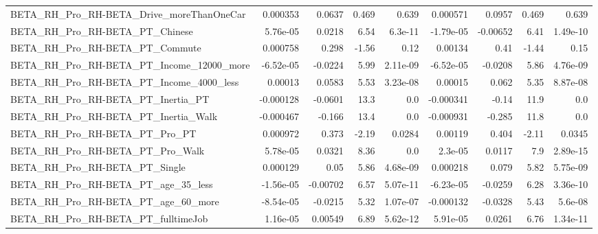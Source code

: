 \begin{tabular}{lrrrrrrrr}
BETA\_RH\_Pro\_RH-BETA\_Drive\_moreThanOneCar           &    0.000353 &       0.0637 &    0.469 &    0.639 &   0.000571 &      0.0957 &        0.469 &         0.639 \\
BETA\_RH\_Pro\_RH-BETA\_PT\_Chinese                     &    5.76e-05 &       0.0218 &     6.54 &  6.3e-11 &  -1.79e-05 &    -0.00652 &         6.41 &      1.49e-10 \\
BETA\_RH\_Pro\_RH-BETA\_PT\_Commute                     &    0.000758 &        0.298 &    -1.56 &     0.12 &    0.00134 &        0.41 &        -1.44 &          0.15 \\
BETA\_RH\_Pro\_RH-BETA\_PT\_Income\_12000\_more           &   -6.52e-05 &      -0.0224 &     5.99 & 2.11e-09 &  -6.52e-05 &     -0.0208 &         5.86 &      4.76e-09 \\
BETA\_RH\_Pro\_RH-BETA\_PT\_Income\_4000\_less            &     0.00013 &       0.0583 &     5.53 & 3.23e-08 &    0.00015 &       0.062 &         5.35 &      8.87e-08 \\
BETA\_RH\_Pro\_RH-BETA\_PT\_Inertia\_PT                  &   -0.000128 &      -0.0601 &     13.3 &      0.0 &  -0.000341 &       -0.14 &         11.9 &           0.0 \\
BETA\_RH\_Pro\_RH-BETA\_PT\_Inertia\_Walk                &   -0.000467 &       -0.166 &     13.4 &      0.0 &  -0.000931 &      -0.285 &         11.8 &           0.0 \\
BETA\_RH\_Pro\_RH-BETA\_PT\_Pro\_PT                      &    0.000972 &        0.373 &    -2.19 &   0.0284 &    0.00119 &       0.404 &        -2.11 &        0.0345 \\
BETA\_RH\_Pro\_RH-BETA\_PT\_Pro\_Walk                    &    5.78e-05 &       0.0321 &     8.36 &      0.0 &    2.3e-05 &      0.0117 &          7.9 &      2.89e-15 \\
BETA\_RH\_Pro\_RH-BETA\_PT\_Single                      &    0.000129 &         0.05 &     5.86 & 4.68e-09 &   0.000218 &       0.079 &         5.82 &      5.75e-09 \\
BETA\_RH\_Pro\_RH-BETA\_PT\_age\_35\_less                 &   -1.56e-05 &     -0.00702 &     6.57 & 5.07e-11 &  -6.23e-05 &     -0.0259 &         6.28 &      3.36e-10 \\
BETA\_RH\_Pro\_RH-BETA\_PT\_age\_60\_more                 &   -8.54e-05 &      -0.0215 &     5.32 & 1.07e-07 &  -0.000132 &     -0.0328 &         5.43 &       5.6e-08 \\
BETA\_RH\_Pro\_RH-BETA\_PT\_fulltimeJob                 &    1.16e-05 &      0.00549 &     6.89 & 5.62e-12 &   5.91e-05 &      0.0261 &         6.76 &      1.34e-11 \\

\end{tabular}

